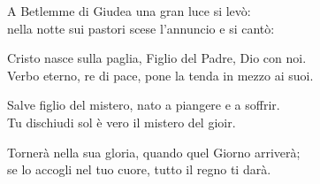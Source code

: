 
\strofa A Betlemme di Giudea una gran luce si levò:\\
nella notte sui pastori scese l'annuncio e si cantò:

\spazio


\spazio

\strofa Cristo nasce sulla paglia, Figlio del Padre, Dio con noi.\\
Verbo eterno, re di pace, pone la tenda in mezzo ai suoi.

\spazio


\spazio

\strofa Salve figlio del mistero, nato a piangere e a soffrir.\\
Tu dischiudi sol è vero il mistero del gioir. 

\spazio


\spazio

\strofa Tornerà nella sua gloria, quando quel Giorno arriverà;\\
se lo accogli nel tuo cuore, tutto il regno ti darà.

\spazio

